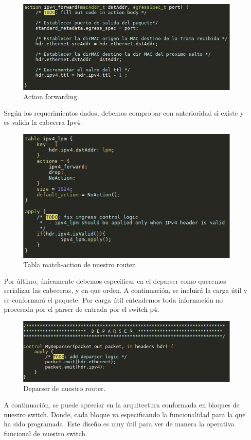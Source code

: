 \begin{figure}[!htb]
  \centering
    \includegraphics[width=0.8\linewidth]{./img/test/3.JPG}
    \caption{Action forwarding.}
  \label{fig:yo}
\end{figure}
Según los requerimientos dados, debemos comprobar con anterioridad si existe y es valida la cabecera Ipv4.
\newpage
\begin{figure}[!htb]
  \centering
    \includegraphics[width=0.7\linewidth]{./img/test/4.JPG}
    \caption{Tabla match-action de nuestro router.}
  \label{fig:yo}
\end{figure}
Por último, únicamente debemos especificar en el deparser como queremos serializar las cabeceras, y en que orden. A continuación, se incluirá la carga útil y se conformará el paquete. Por carga útil entendemos toda información no procesada por el parser de entrada por el switch p4.
\begin{figure}[!htb]
  \centering
    \includegraphics[width=0.8\linewidth]{./img/test/5.JPG}
    \caption{Deparser de nuestro router.}
  \label{fig:yo}
\end{figure}
\newline
\newline
A continuación, se puede apreciar en la arquitectura conformada en bloques de nuestro switch. Donde, cada bloque va especificando la funcionalidad para la que ha sido programada. Este diseño es muy útil para ver de manera la operativa funcional de nuestro switch.
